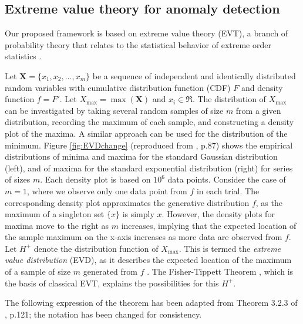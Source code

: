 \documentclass[12pt]{article}
\begin{document}
\hypertarget{extreme-value-theory-for-anomaly-detection}{%
\subsection{Extreme value theory for anomaly
detection}\label{extreme-value-theory-for-anomaly-detection}}

\label{sec:evanom}

Our proposed framework is based on extreme value theory (EVT), a branch
of probability theory that relates to the statistical behavior of
extreme order statistics \citep{galambos2013extreme}.

Let \(\bm{X}= \{x_{1}, x_{2},\dots,x_{m}\}\) be a sequence of
independent and identically distributed random variables with cumulative
distribution function (CDF) \(F\) and density function \(f=F'\). Let
\(X_{\text{max}} = \max(\bm{X})\) and \(x_{i} \in \Re\). The
distribution of \(X_{\text{max}}\) can be investigated by taking several
random samples of size \(m\) from a given distribution, recording the
maximum of each sample, and constructing a density plot of the maxima. A
similar approach can be used for the distribution of the minimum. Figure
\ref{fig:EVDchange} (reproduced from \citep{hugueny2013novelty}, p.87)
shows the empirical distributions of minima and maxima for the standard
Gaussian distribution (left), and of maxima for the standard exponential
distribution (right) for series of sizes \(m\). Each density plot is
based on \(10^6\) data points. Consider the case of \(m=1\), where we
observe only one data point from \(f\) in each trial. The corresponding
density plot approximates the generative distribution \(f\), as the
maximum of a singleton set \(\{x\}\) is simply \(x\). However, the
density plots for maxima move to the right as \(m\) increases, implying
that the expected location of the sample maximum on the x-axis increases
as more data are observed from \(f\). Let \(H^{+}\) denote the
distribution function of \(X_{\text{max}}\). This is termed the
\emph{extreme value distribution} (EVD), as it describes the expected
location of the maximum of a sample of size \(m\) generated from \(f\)
\citep{clifton2011novelty}. The Fisher-Tippett Theorem
\citep{fisher1928limiting}, which is the basis of classical EVT,
explains the possibilities for this \(H^{+}\).

The following expression of the theorem has been adapted from Theorem
3.2.3 of \citet{embrechts2013modelling}, p.121; the notation has been
changed for consistency.
\end{document}
